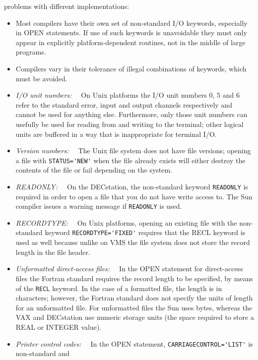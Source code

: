 \documentclass[twoside,11pt]{article}
\renewcommand{\_}{{\tt\char'137}}
\begin{document}
\begin{itemize}
  problems with different implementations:
  \begin{itemize}
   \item Most compilers have their own set of non-standard I/O keywords,
    especially in OPEN statements.  If use of such keywords is
    unavoidable they must only appear in explicitly platform-dependent
    routines, not in the middle of large programs.
   \item Compilers vary in their tolerance of illegal combinations of
    keywords, which must be avoided.
   \item {\it I/O unit numbers:~~}
    On Unix platforms the I/O unit numbers 0, 5 and 6 refer to the standard
    error, input and output channels respectively and cannot be used for
    anything else.  Furthermore, only those unit numbers can usefully be used
    for reading from and writing to the terminal; other logical units are
    buffered in a way that is inappropriate for terminal I/O.
   \item {\it Version numbers:~~}
    The Unix file system does not have file versions; opening a
    file with \verb|STATUS='NEW'| when the
    file already exists will either destroy
    the contents of the file or fail depending on the system.
   \item {\it READONLY:~~}
    On the DECstation, the non-standard keyword \verb|READONLY| is required in
    order to open a file that you do not have write access to. The Sun
    compiler issues a warning message if \verb|READONLY| is used.
   \item {\it RECORDTYPE:~~}
    On Unix platforms, opening an existing file with the non-standard
    keyword \verb|RECORDTYPE='FIXED'| requires
    that the RECL keyword is used as well because unlike on VMS the file
    system does not store the record length in the file header.
   \item {\it Unformatted direct-access files:~~}
    In the OPEN statement for direct-access files the Fortran standard
    requires the record length to be specified, by means of the
    \verb|RECL| keyword.
    In the case of a formatted file, the length is in characters;  however,
    the Fortran standard does not specify the units of length for
    an unformatted file.  For unformatted files the Sun uses bytes, whereas
    the VAX and DECstation use numeric storage units (the space required
    to store a REAL or INTEGER value).
   \item {\it Printer control codes:~~}
    In the OPEN statement, \verb|CARRIAGECONTROL='LIST'| is non-standard and

\end{itemize}
\end{itemize}
\end{document}

